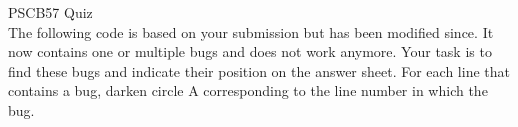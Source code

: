 \documentclass{article}
\begin{document}
\noindent
{\huge PSCB57 Quiz}\\[1pt]

\noindent
The following code is based on your submission but has been modified since.
It now contains one or multiple bugs and does not work anymore.
Your task is to find these bugs and indicate their position on the answer sheet.
For each line that contains a bug, darken circle A corresponding to the line number in which the bug. 
 

\end{document}
